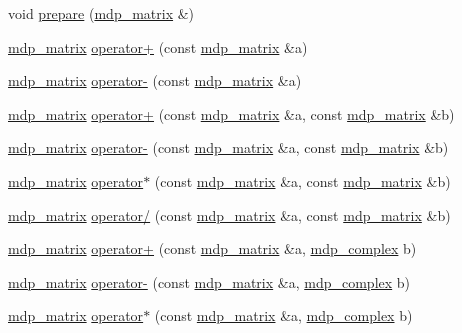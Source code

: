\begin{DoxyCompactItemize}
\item 
void \hyperlink{classmdp__matrix_a9b5dd55d85b884176c25b3f0967285f0}{prepare} (\hyperlink{classmdp__matrix}{mdp\+\_\+matrix} \&)
\item 
\hyperlink{classmdp__matrix}{mdp\+\_\+matrix} \hyperlink{classmdp__matrix_ac277f7b8abb06215be34e3db82ff6c0a}{operator+} (const \hyperlink{classmdp__matrix}{mdp\+\_\+matrix} \&a)
\item 
\hyperlink{classmdp__matrix}{mdp\+\_\+matrix} \hyperlink{classmdp__matrix_a6861cfe08a2620bce0a79c2528721884}{operator-\/} (const \hyperlink{classmdp__matrix}{mdp\+\_\+matrix} \&a)
\item 
\hyperlink{classmdp__matrix}{mdp\+\_\+matrix} \hyperlink{classmdp__matrix_a17f483c5cf65d00c950c21fb7e467a71}{operator+} (const \hyperlink{classmdp__matrix}{mdp\+\_\+matrix} \&a, const \hyperlink{classmdp__matrix}{mdp\+\_\+matrix} \&b)
\item 
\hyperlink{classmdp__matrix}{mdp\+\_\+matrix} \hyperlink{classmdp__matrix_a60f405280a02350fdc22b1b8b86712c6}{operator-\/} (const \hyperlink{classmdp__matrix}{mdp\+\_\+matrix} \&a, const \hyperlink{classmdp__matrix}{mdp\+\_\+matrix} \&b)
\item 
\hyperlink{classmdp__matrix}{mdp\+\_\+matrix} \hyperlink{classmdp__matrix_acf7cf6445d6a42f2aa791bc1088a816f}{operator$\ast$} (const \hyperlink{classmdp__matrix}{mdp\+\_\+matrix} \&a, const \hyperlink{classmdp__matrix}{mdp\+\_\+matrix} \&b)
\item 
\hyperlink{classmdp__matrix}{mdp\+\_\+matrix} \hyperlink{classmdp__matrix_a9966401a50b7969c45d1fc3e3290f404}{operator/} (const \hyperlink{classmdp__matrix}{mdp\+\_\+matrix} \&a, const \hyperlink{classmdp__matrix}{mdp\+\_\+matrix} \&b)
\item 
\hyperlink{classmdp__matrix}{mdp\+\_\+matrix} \hyperlink{classmdp__matrix_a9c3c774b4ef0650ed3ede792dd8b9bcc}{operator+} (const \hyperlink{classmdp__matrix}{mdp\+\_\+matrix} \&a, \hyperlink{classmdp__complex}{mdp\+\_\+complex} b)
\item 
\hyperlink{classmdp__matrix}{mdp\+\_\+matrix} \hyperlink{classmdp__matrix_ad5af014fcf319974b767e466ebbe0a41}{operator-\/} (const \hyperlink{classmdp__matrix}{mdp\+\_\+matrix} \&a, \hyperlink{classmdp__complex}{mdp\+\_\+complex} b)
\item 
\hyperlink{classmdp__matrix}{mdp\+\_\+matrix} \hyperlink{classmdp__matrix_a0fc0749acc8f2a3f26f0daf14797a9e5}{operator$\ast$} (const \hyperlink{classmdp__matrix}{mdp\+\_\+matrix} \&a, \hyperlink{classmdp__complex}{mdp\+\_\+complex} b)

\end{DoxyCompactItemize}
